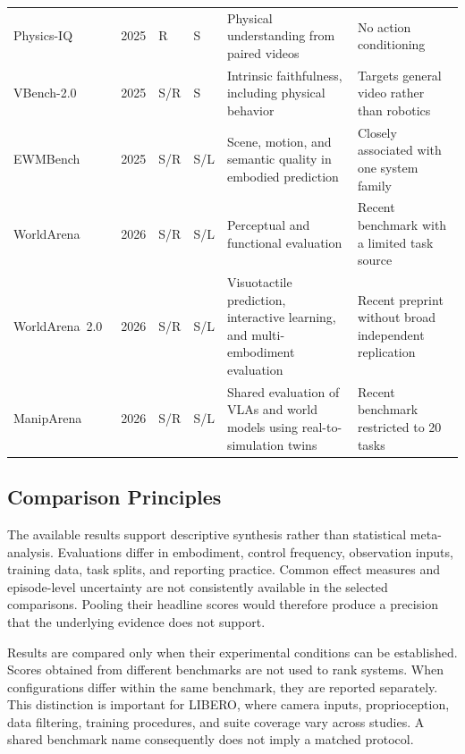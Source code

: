 \documentclass{ieeeaccess}
\begin{document}
\begin{table}[!t]
\begin{tabular}{p{3.7cm}llp{0.8cm}p{4.4cm}p{4.0cm}}
Physics-IQ~\cite{physicsiq} & 2025 & R & S &
Physical understanding from paired videos &
No action conditioning \\

VBench-2.0~\cite{vbench2} & 2025 & S/R & S &
Intrinsic faithfulness, including physical behavior &
Targets general video rather than robotics \\

EWMBench~\cite{genieenvisioner} & 2025 & S/R & S/L &
Scene, motion, and semantic quality in embodied prediction &
Closely associated with one system family \\

WorldArena~\cite{worldarena} & 2026 & S/R & S/L &
Perceptual and functional evaluation &
Recent benchmark with a limited task source \\

WorldArena~2.0~\cite{shang2026worldarena2} & 2026 & S/R & S/L &
Visuotactile prediction, interactive learning, and multi-embodiment evaluation &
Recent preprint without broad independent replication \\

ManipArena~\cite{maniparena} & 2026 & S/R & S/L &
Shared evaluation of VLAs and world models using real-to-simulation twins &
Recent benchmark restricted to 20 tasks \\
\bottomrule
\end{tabular}
\end{table}

\subsection{Comparison Principles}
\label{sec:comparison-principles}

The available results support descriptive synthesis rather than statistical meta-analysis. Evaluations differ in embodiment, control frequency, observation inputs, training data, task splits, and reporting practice. \textcolor[RGB]{104,48,148}{Common effect measures and episode-level uncertainty are not consistently available in the selected comparisons.} Pooling their headline scores would therefore produce a precision that the underlying evidence does not support.

Results are compared only when their experimental conditions can be established. Scores obtained from different benchmarks are not used to rank systems. When configurations differ within the same benchmark, they are reported separately. This distinction is important for LIBERO, where camera inputs, proprioception, data filtering, training procedures, and suite coverage vary across studies. A shared benchmark name consequently does not imply a matched protocol.
\end{document}
